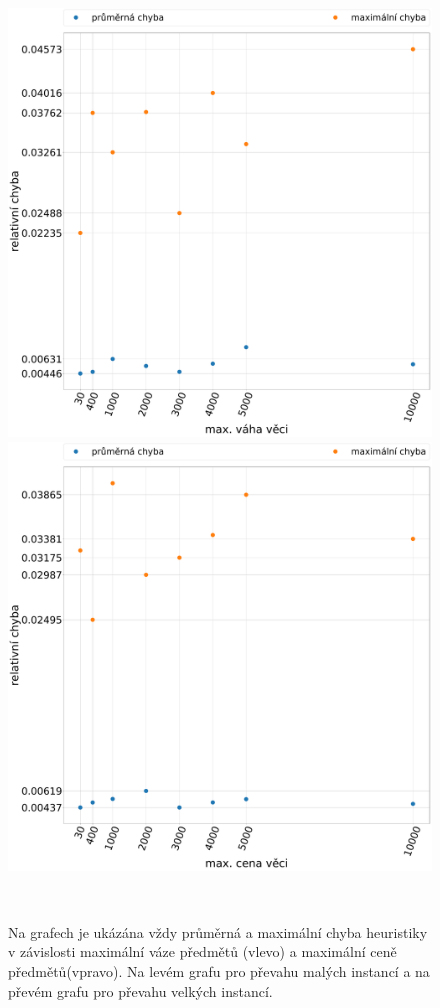 \documentclass[11pt]{article}
\begin{document}
    
\begin{figure}
	\centering
    \begin{minipage}[c]{0.49\textwidth}
        \centering\includegraphics[width=\textwidth]{img/WHE.pdf} 
    \end{minipage}
    \begin{minipage}[c]{0.49\textwidth}
        \centering \includegraphics[width=\textwidth]{img/CHE.pdf} 
    \end{minipage}
    \\
   \caption{Na grafech je ukázána vždy průměrná a maximální chyba heuristiky v závislosti maximální váze předmětů (vlevo) a maximální ceně předmětů(vpravo). Na levém grafu pro převahu malých instancí a na převém grafu pro převahu velkých instancí.}\label{fig:WCEI}
    \end{figure} 
    
\end{document}
